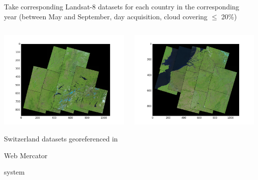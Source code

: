 \documentclass[c]{beamer}
\begin{document}
\begin{frame}
\begin{itemize}
{ \item Take corresponding Landsat-8 datasets for each country in the corresponding year (between May and September, day acquisition, cloud covering $\leq$ 20\%)
 \begin{columns}
  \begin{column}{0.33\textwidth}
  \begin{overlayarea}{\linewidth}{3cm}
    \centering\vfill
    \includegraphics[scale=0.20]{i../../data/Suisse/covering-selection.png}
  \end{overlayarea}
  \begin{overlayarea}{\linewidth}{1cm}
    \centering
    \tiny Switzerland datasets georeferenced in \begin{itshape}Web Mercator\end{itshape} system\par
  \end{overlayarea}
  \end{column}
  \begin{column}{0.33\textwidth}
   \begin{overlayarea}{\linewidth}{3cm}
    \centering\vfill
    \includegraphics[scale=0.20]{../../data/Belgique/covering-selection.png}

\end{overlayarea}
\end{column}
\end{columns}}
\end{itemize}
\end{frame}
\end{document}
